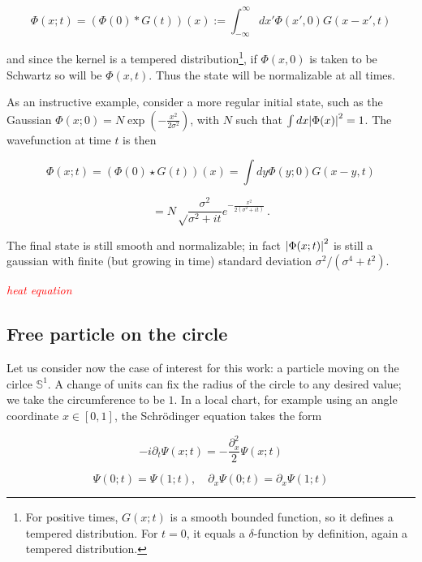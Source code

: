 \documentclass{article}
\newcommand{\ess}{\ensuremath{\mathbb{S}}}
\newcommand{\cmnt}[1]{\textcolor{red}{\emph{#1}}}
\newcommand{\intR}{\int_{-\infty}^\infty}
\begin{document}
\begin{equation}
    \Phi(x;t) = \left(\Phi(0) * G(t) \right)(x) := \intR dx' \Phi(x',0) G(x-x',t)
\end{equation}

and since the kernel is a tempered distribution\footnote{For positive times, $G(x;t)$ is a smooth bounded function, so it defines a tempered distribution. For $t=0$, it equals a $\delta$-function by definition, again a tempered distribution.}, if $\Phi(x,0)$ is taken to be Schwartz so will be $\Phi(x,t)$. Thus the state will be normalizable at all times.

As an instructive example, consider a more regular initial state, such as the Gaussian $\Phi(x;0) = N \exp(-\frac{x^2}{2\sigma^2} )$, with $N$ such that $\int dx \abs{\Phi(x)}^2 = 1$. The wavefunction at time $t$ is then

\begin{equation}
    \Phi(x;t) = \left( \Phi(0) \star G(t) \right)(x) = \int dy \Phi(y;0) G(x-y,t)
\end{equation}

\begin{equation}
    = N \sqrt\frac{\sigma^2}{\sigma^2 + it} e^{-\frac{x^2}{2(\sigma^2 + it)}}\,.
\end{equation}

The final state is still smooth and normalizable; in fact $\abs{\Phi(x;t)}^2$ is still a gaussian with finite (but growing in time) standard deviation $\sigma^2/(\sigma^4 + t^2)$.


\cmnt{heat equation}

\subsection{Free particle on the circle}

Let us consider now the case of interest for this work: a particle moving on the cirlce $\ess^1$. A change of units can fix the radius of the circle to any desired value; we take the circumference to be $1$. In a local chart, for example using an angle coordinate $x \in [0,1]$, the Schr\"odinger equation takes the form

\begin{equation}
    -i\partial_t \Psi(x;t) = - \frac{\partial_x^2}{2} \Psi(x;t)
\end{equation}

\begin{equation}    
    \label{boundaryconds}
    \Psi(0;t) = \Psi(1;t), \quad \partial_x \Psi(0;t) = \partial_x \Psi(1;t)
\end{equation}
\end{document}
